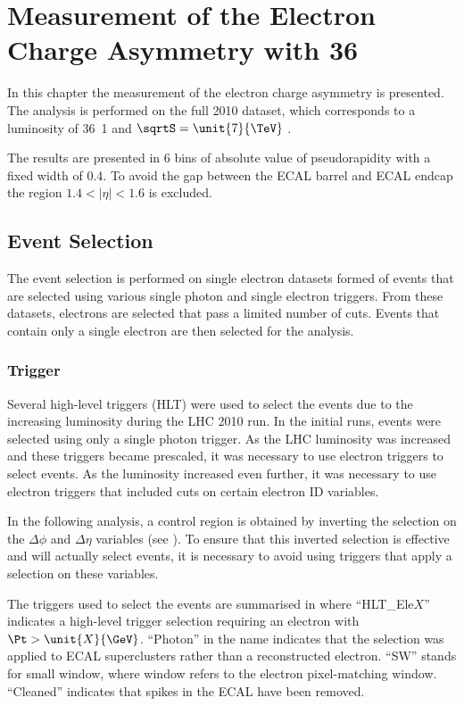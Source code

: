 \chapter[Electron Charge Asymmetry Measurement]{Measurement of the Electron Charge Asymmetry
 with \unit{36}{\invpb} }
\label{chap:analysis}

In this chapter the measurement of the electron charge asymmetry is presented.
The analysis is performed on the full 2010 dataset, which corresponds to a
luminosity of \unit{36.1}{\invpb} and $\sqrtS = \unit{7}{\TeV}$
\cite{asym36,baisini2010electron}.

The results are presented in 6 bins of absolute value of pseudorapidity with a
fixed width of 0.4. To avoid the gap between the ECAL barrel and ECAL endcap the
region $1.4<|\eta|<1.6$ is excluded.

\section{Event Selection}

The event selection is performed on single electron datasets formed of events
that are selected using various single photon and single electron triggers. From
these datasets, electrons are selected that pass a limited number of cuts.
Events that contain only a single electron are then selected for the analysis.

\subsection{Trigger}

Several high-level triggers (HLT) were used to select the events due to the
increasing luminosity during the {LHC} 2010 run.  In the initial runs, events
were selected using only a single photon trigger.  As the {LHC} luminosity was
increased and these triggers became prescaled, it was necessary to use electron
triggers to select events.  As the luminosity increased even further, it was
necessary to use electron triggers that included cuts on certain electron ID
variables.

In the following analysis, a control region is obtained by inverting the
selection on the $\Delta\phi$ and $\Delta\eta$ variables (see
).
To ensure that this inverted selection is effective and will actually
select events, it is necessary to avoid using triggers that apply a selection on
these variables.

The triggers used to select the events are summarised in 
where ``HLT\_Ele$X$'' indicates a high-level trigger selection requiring an
electron with  $\Pt > \unit{X}{\GeV}$.  ``Photon'' in the name indicates that
the selection was applied to ECAL superclusters rather than a reconstructed
electron.  ``SW'' stands for small window, where window refers to the electron
pixel-matching window.  ``Cleaned'' indicates that spikes in the {ECAL} have
been removed.  

